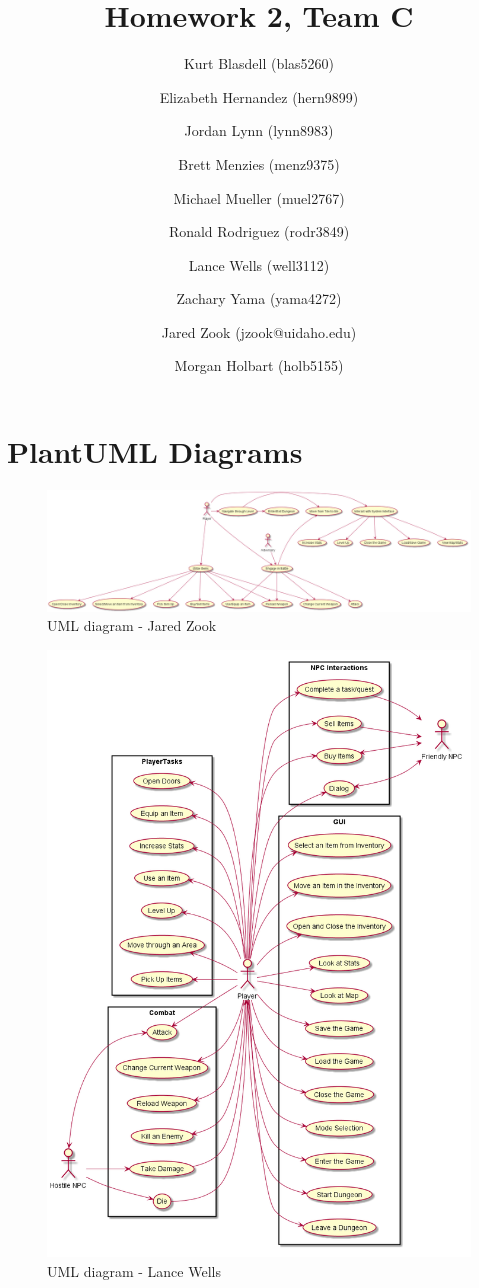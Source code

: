 \documentclass[12pt]{report}
\title{Homework 2, Team C}
\author{ Kurt Blasdell (blas5260)
\and Elizabeth Hernandez (hern9899)
\and Jordan Lynn (lynn8983)
\and Brett Menzies (menz9375)
\and Michael Mueller (muel2767)
\and Ronald Rodriguez (rodr3849)
\and Lance Wells (well3112)
\and Zachary Yama (yama4272)
\and Jared Zook (jzook@uidaho.edu)
\and Morgan Holbart (holb5155)
}
\begin{document}
    \maketitle

\tableofcontents{}

\chapter{PlantUML Diagrams}
\begin{figure}
	\includegraphics[scale=0.25,left]{uml-Jared_Zook.png}
	\caption{UML diagram - Jared Zook}
\end{figure}

\begin{figure}
	\centering
	\includegraphics[scale=0.4,center]{uml-Lance_Wells.png}
	\caption{UML diagram - Lance Wells}
\end{figure}
\end{document}
